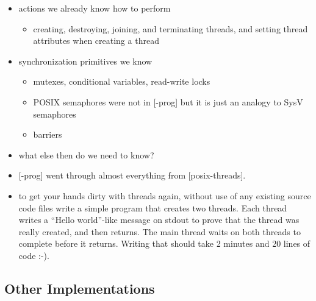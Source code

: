 \begin{itemize}
\item actions we already know how to perform
	\begin{itemize}
	\item creating, destroying, joining, and terminating threads, and
	setting thread attributes when creating a thread
	\end{itemize}
\item synchronization primitives we know
	\begin{itemize}
	\item mutexes, conditional variables, read-write locks
	\item POSIX semaphores were not in [\myun\myix-prog] but it is just an
	analogy to SysV semaphores
	\item barriers
	\end{itemize}
\item what else then do we need to know?
\end{itemize}

\begin{itemize}
\item {}[\myun\myix-prog] went through almost everything from [posix-threads].
\item \label{THREAD_RECAP}  to get your hands dirty with
threads again, without use of any existing source code files write a simple
program that creates two threads. Each thread writes a ``Hello world''-like
message on stdout to prove that the thread was really created, and then returns.
The main thread waits on both threads to complete before it returns. Writing
that should take 2 minutes and 20 lines of code :-).
\end{itemize}


\subsection{Other Implementations}

